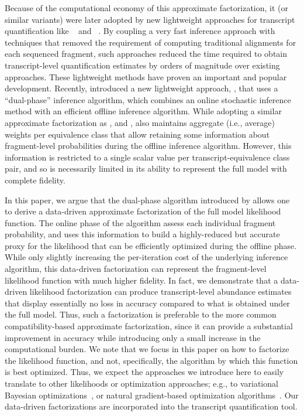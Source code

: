 Because of the computational economy of this approximate factorization, it 
(or similar variants) were later adopted by new lightweight approaches for 
transcript quantification like \sailfish~\citep{Patro2014Sailfish,Srivastava2016rapmap} 
and \kallisto~\citep{Bray2016Kallisto}.  By coupling a very fast inference approach with 
techniques that removed the requirement of computing traditional alignments for each 
sequenced fragment, such approaches reduced the time required to obtain transcript-level 
quantification estimates by orders of magnitude over existing approaches.  These 
lightweight methods have proven an important and popular development.  Recently, 
\citet{Patro2017Salmon} introduced a new lightweight approach, \salmon, that uses a 
``dual-phase'' inference algorithm, which combines an online stochastic inference method 
with an efficient offline inference algorithm. While adopting a similar approximate 
factorization as \mmseq, \sailfish and \kallisto, \salmon also maintains aggregate 
(i.e., average) weights per equivalence class that allow retaining some information 
about fragment-level probabilities during the offline inference algorithm.  However, this 
information is restricted to a single scalar value per transcript-equivalence class pair, 
and so is necessarily limited in its ability to represent the full model with complete 
fidelity.

In this paper, we argue that the dual-phase algorithm introduced by \salmon 
allows one to derive a data-driven approximate factorization of the full model 
likelihood function.  The online phase of the algorithm assess each individual 
fragment probability, and uses this information to build a highly-reduced but 
accurate proxy for the \fm likelihood that can be efficiently optimized during 
the offline phase. While only slightly increasing the per-iteration cost of the 
underlying inference algorithm, this data-driven factorization can represent the 
fragment-level likelihood function with much higher fidelity.  In fact, we 
demonstrate that a data-driven likelihood factorization can produce transcript-level 
abundance estimates that display essentially no loss in accuracy compared to what is 
obtained under the full model.  Thus, such a factorization is preferable to the more 
common compatibility-based approximate factorization, since it can provide a substantial 
improvement in accuracy while introducing only a small increase in the computational 
burden.  We note that we focus in this paper on how to factorize the likelihood function, 
and not, specifically, the algorithm by which this function is best optimized.  Thus, we 
expect the approaches we introduce here to easily translate to other likelihoods or 
optimization approaches; e.g., to variational Bayesian optimizations~\citep{tigar}, or 
natural gradient-based optimization algorithms~\citep{bitseqvb}. Our data-driven 
factorizations are incorporated into the \salmon transcript quantification tool.

